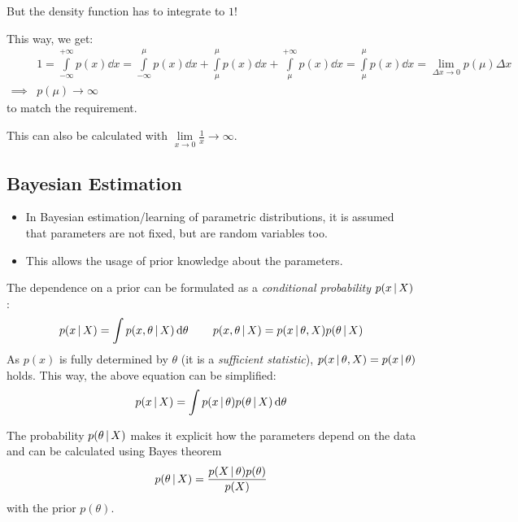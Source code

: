				But the density function has to integrate to \(1\)!

				This way, we get:
				\begin{align}
					& 1 = \int\limits_{-\infty}^{+\infty} p(x) \dd{x} = \int\limits_{-\infty}^\mu p(x) \dd{x} + \int\limits_{\mu}^\mu p(x) \dd{x} + \int\limits_\mu^{+\infty} p(x) \dd{x} = \int\limits_{\mu}^\mu p(x) \dd{x} = \lim\limits_{\Delta x \to 0} p(\mu) \Delta x  \\
					\implies & p(\mu) \to \infty
				\end{align}
				to match the requirement.

				This can also be calculated with \( \lim\limits_{x \to 0} \frac{1}{x} \to \infty \).

		\subsection{Bayesian Estimation}
			\begin{itemize}
				\item In Bayesian estimation/learning of parametric distributions, it is assumed that parameters are not fixed, but are random variables too.
				\item This allows the usage of prior knowledge about the parameters.
			\end{itemize}

			The dependence on a prior can be formulated as a \emph{conditional probability} \( p(x \,\vert\, X) \):
			\begin{equation}
				p(x \,\vert\, X) = \int p(x, \theta \,\vert\, X) \dd{\theta} \qquad p(x, \theta \,\vert\, X) = p(x \,\vert\, \theta, X) p(\theta \,\vert\, X)
			\end{equation}
			As \( p(x) \) is fully determined by \(\theta\) (it is a \emph{sufficient statistic}), \( p(x \,\vert\, \theta, X) = p(x \,\vert\, \theta) \) holds. This way, the above equation can be simplified:
			\begin{equation}
				p(x \,\vert\, X) = \int p(x \,\vert\, \theta) p(\theta \,\vert\, X) \dd{\theta}
			\end{equation}

			The probability \( p(\theta \,\vert\, X) \) makes it explicit how the parameters depend on the data and can be calculated using Bayes theorem
			\begin{equation}
				p(\theta \,\vert\, X) = \frac{p(X \,\vert\, \theta) p(\theta)}{p(X)}
			\end{equation}
			with the prior \( p(\theta) \).

